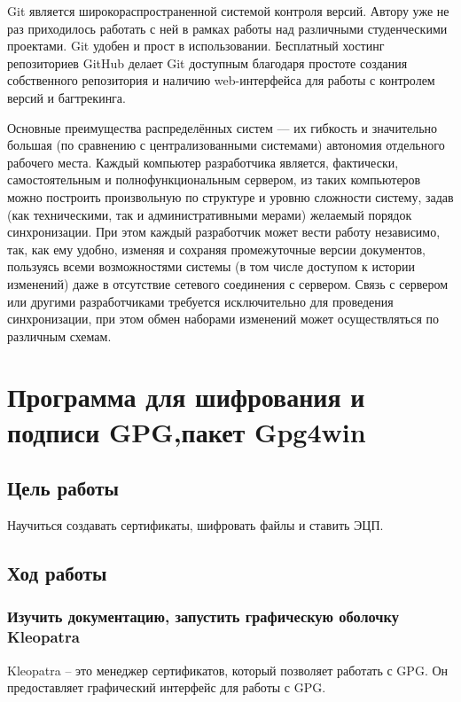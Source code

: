 \documentclass[12pt,a4paper]{article}
\begin{document}
Git является широкораспространенной системой контроля версий. Автору уже не раз приходилось работать с ней в рамках работы над различными студенческими проектами. Git удобен и прост в использовании. Бесплатный хостинг репозиториев GitHub делает Git доступным благодаря простоте создания собственного репозитория и наличию web-интерфейса для работы с контролем версий и багтрекинга.

Основные преимущества распределённых систем — их гибкость и значительно большая (по сравнению с централизованными системами) автономия отдельного рабочего места. Каждый компьютер разработчика является, фактически, самостоятельным и полнофункциональным сервером, из таких компьютеров можно построить произвольную по структуре и уровню сложности систему, задав (как техническими, так и административными мерами) желаемый порядок синхронизации. При этом каждый разработчик может вести работу независимо, так, как ему удобно, изменяя и сохраняя промежуточные версии документов, пользуясь всеми возможностями системы (в том числе доступом к истории изменений) даже в отсутствие сетевого соединения с сервером. Связь с сервером или другими разработчиками требуется исключительно для проведения синхронизации, при этом обмен наборами изменений может осуществляться по различным схемам.
\section{Программа для шифрования и подписи GPG,пакет Gpg4win}
\subsection{Цель работы}
Научиться создавать сертификаты, шифровать файлы и ставить ЭЦП.
\subsection{Ход работы}
\subsubsection{ Изучить документацию, запустить графическую оболочку Kleopatra}
Kleopatra -- это менеджер сертификатов, который позволяет работать с GPG. Он предоставляет графический интерфейс для работы с GPG.
\end{document}
